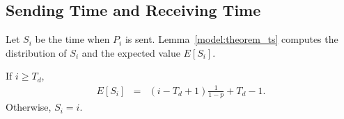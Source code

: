 \subsection{Sending Time and Receiving Time}
Let $S_i$ be the time when $P_i$ is sent. %
Lemma~\ref{model:theorem_ts} computes the distribution of $S_i$ and the expected value $E[S_i]$.
\begin{lemma} \label{model:theorem_ts}
If $i \geq T_{d}$, %
\begin{eqnarray*}
E[S_i]          &=& (i - T_d + 1)\frac{1}{1-p} + T_d - 1.
\end{eqnarray*}
Otherwise, %
$S_i = i$.
\end{lemma}
\if{}
